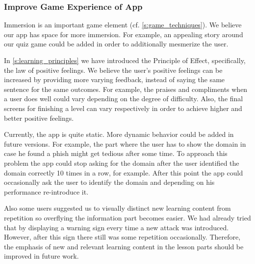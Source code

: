 \subsubsection{Improve Game Experience of App}
\begin{description}[leftmargin=0cm]
	\item[Increase Immersion:] Immersion is an important game element (cf. \autoref{s:game_techniques}).
	We believe our app has space for more immersion. 
	For example, an appealing story around our quiz game could be added in order to additionally mesmerize the user.
	\item[Increase Effect:] In \autoref{s:learning_principles} we have introduced the Principle of Effect, specifically, the law of positive feelings. 
	We believe the user's positive feelings can be increased by providing more varying feedback, instead of saying the same sentence for the same outcomes.
	For example, the praises and compliments when a user does well could vary depending on the degree of difficulty.
	Also, the final screens for finishing a level can vary respectively in order to achieve higher and better positive feelings.
	\item[Performance Dependent App Behavior:] Currently, the app is quite static.
More dynamic behavior could be added in future versions.
For example, the part where the user has to show the domain in case he found a phish might get tedious after some time.
To approach this problem the app could stop asking for the domain after the user identified the domain correctly 10 times in a row, for example.
After this point the app could occasionally ask the user to identify the domain and depending on his performance re-introduce it. 
\item[Text Highlighting]
Also some users suggested us to visually distinct new learning content from repetition so overflying the information part becomes easier. 
We had already tried that by displaying a warning sign every time a new attack was introduced.
However, after this sign there still was some repetition occasionally.
Therefore, the emphasis of new and relevant learning content in the lesson parts should be improved in future work.
\end{description}


